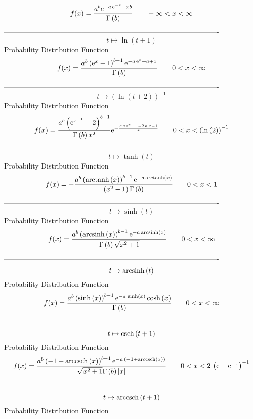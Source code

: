\documentclass[12pt]{article}
\begin{document}
$$  f(x)={\frac {{a}^{b}{{\rm e}^{-a\,{{\rm e}^{-x}}-xb}}}{\Gamma \left( b
 \right) }}
 \qquad-\infty 
 < x < \infty 
$$-------------------------------------------------------------------------------------------  \\$$t\mapsto \ln  \left( t+1 \right) 
$$Probability Distribution Function 
$$  f(x)={\frac {{a}^{b} \left( {{\rm e}^{x}}-1 \right) ^{b-1}{{\rm e}^{-a\,{
{\rm e}^{x}}+a+x}}}{\Gamma \left( b \right) }}
 \qquad0
 < x < \infty 
$$-------------------------------------------------------------------------------------------  \\$$t\mapsto  \left( \ln  \left( t+2 \right)  \right) ^{-1}
$$Probability Distribution Function 
$$  f(x)={\frac {{a}^{b} \left( {{\rm e}^{{x}^{-1}}}-2 \right) ^{b-1}}{\Gamma
 \left( b \right) {x}^{2}}{{\rm e}^{-{\frac {a\,x{{\rm e}^{{x}^{-1}}}-
2\,a\,x-1}{x}}}}}
 \qquad0
 < x <  \left( \ln  \left( 2 \right)  \right) ^{-1}
$$-------------------------------------------------------------------------------------------  \\$$t\mapsto \tanh \left( t \right) 
$$Probability Distribution Function 
$$  f(x)=-{\frac {{a}^{b} \left( {\rm arctanh} \left(x\right) \right) ^{b-1}{
{\rm e}^{-a\,{\rm arctanh} \left(x\right)}}}{ \left( {x}^{2}-1
 \right) \Gamma \left( b \right) }}
 \qquad0
 < x < 1
$$-------------------------------------------------------------------------------------------  \\$$t\mapsto \sinh \left( t \right) 
$$Probability Distribution Function 
$$  f(x)={\frac {{a}^{b} \left( {\rm arcsinh} \left(x\right) \right) ^{b-1}{
{\rm e}^{-a\,{\rm arcsinh} \left(x\right)}}}{\Gamma \left( b \right) 
\sqrt {{x}^{2}+1}}}
 \qquad0
 < x < \infty 
$$-------------------------------------------------------------------------------------------  \\$$t\mapsto {\rm arcsinh} \left(t\right)
$$Probability Distribution Function 
$$  f(x)={\frac {{a}^{b} \left( \sinh \left( x \right)  \right) ^{b-1}{{\rm e}^
{-a\,\sinh \left( x \right) }}\cosh \left( x \right) }{\Gamma \left( b
 \right) }}
 \qquad0
 < x < \infty 
$$-------------------------------------------------------------------------------------------  \\$$t\mapsto {\rm csch} \left(t+1\right)
$$Probability Distribution Function 
$$  f(x)={\frac {{a}^{b} \left( -1+{\rm arccsch} \left(x\right) \right) ^{b-1}{
{\rm e}^{-a\, \left( -1+{\rm arccsch} \left(x\right) \right) }}}{
\sqrt {{x}^{2}+1}\Gamma \left( b \right)  \left| x \right| }}
 \qquad0
 < x < 2\, \left( {\rm e}-{{\rm e}^{-1}} \right) ^{-1}
$$-------------------------------------------------------------------------------------------  \\$$t\mapsto {\rm arccsch} \left(t+1\right)
$$Probability Distribution Function 
\end{document}
